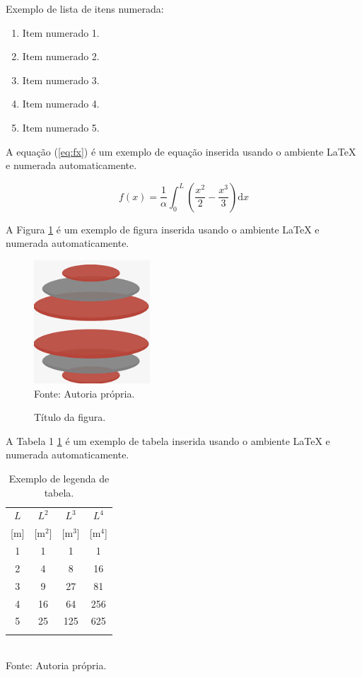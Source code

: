 \documentclass[
article,			%
11pt,				%
twoside,			%
a4paper,			%
section=TITLE,		%
onecolumn,          %
english,			%
brazil,				%
sumario=tradicional
]{abntex2}
\begin{document}
Exemplo de lista de itens numerada:
\begin{enumerate}
\item Item numerado 1.
\item Item numerado 2.
\item Item numerado 3.
\item Item numerado 4.
\item Item numerado 5.
\end{enumerate}

A equação (\ref{eq:fx}) é um exemplo de equação inserida usando o ambiente LaTeX e numerada automaticamente.

\begin{equation}
\label{eq:fx}
f(x) = \frac{1}{\alpha} \int_0^L \left(\frac{x^2}{2} -\frac{x^3}{3}\right) \mathrm{d} x
\end{equation}


A Figura \ref{fig1} é um exemplo de figura inserida usando o ambiente LaTeX e numerada automaticamente.

\begin{figure}[!htb]
\centering%
\caption{Título da figura.}%
\label{fig1}
\includegraphics[width = 0.5\columnwidth]{figuras/Imagem1.png}
\\Fonte: Autoria própria.
\end{figure}

A Tabela 1 \ref{tab:Ldimens} é um exemplo de tabela inserida usando o ambiente LaTeX e numerada automaticamente.

\begin{table}[!htb]
\centering%
\small%
\caption{Exemplo de legenda de tabela.}%
\label{tab:Ldimens}
\begin{tabular*}{\columnwidth}{@{\extracolsep{\fill}}cccc}
\toprule
$L$   & $L^2$     & $L^3$     & $L^4$     \\
{[m]} & {[m$^2$]} & {[m$^3$]} & {[m$^4$]} \\
\midrule
1     & 1         & 1         & 1         \\
2     & 4         & 8         & 16        \\
3     & 9         & 27        & 81        \\
4     & 16        & 64        & 256       \\
5     & 25        & 125       & 625       \\
\bottomrule
\addlinespace
\end{tabular*}
\\Fonte: Autoria própria.
\end{table}
\end{document}
